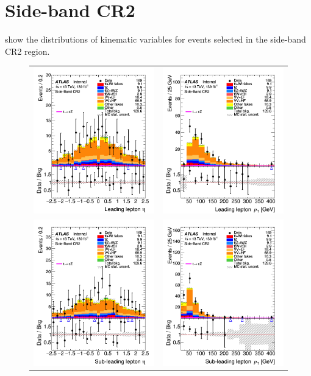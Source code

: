 \clearpage
\FloatBarrier
\section{Side-band CR2}
\label{app:CRs:SB2}
 show the distributions 
of kinematic variables for events selected in the side-band CR2 region.

\begin{figure}[!htbp]
	\centering
	\begin{tabular}{cc}
		\includegraphics[width=.32\textwidth]{Appendices/AP5/figures/SBCR2/lep1_eta} &
		\includegraphics[width=.32\textwidth]{Appendices/AP5/figures/SBCR2/lep1_pt} \\
		\includegraphics[width=.32\textwidth]{Appendices/AP5/figures/SBCR2/lep2_eta} &
		\includegraphics[width=.32\textwidth]{Appendices/AP5/figures/SBCR2/lep2_pt} \\

\end{tabular}
\end{figure}
